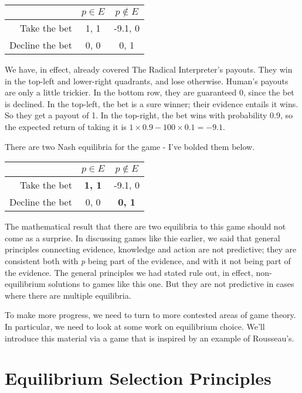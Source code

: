 \begin{center}
\begin{tabular}{r | c c}
& $p \in E$ & $p \notin E$ \\ \hline
Take the bet & 1, 1 & -9.1, 0 \\
Decline the bet & 0, 0 & 0, 1
\end{tabular}
\end{center}


We have, in effect, already covered The Radical Interpreter's payouts. They win in the top-left and lower-right quadrants, and lose otherwise. Human's payouts are only a little trickier. In the bottom row, they are guaranteed 0, since the bet is declined. In the top-left, the bet is a sure winner; their evidence entails it wins. So they get a payout of 1. In the top-right, the bet wins with probability 0.9, so the expected return of taking it is $1 \times 0.9 - 100 \times 0.1 = -9.1$.

There are two Nash equilibria for the game - I've bolded them below.


\begin{center}
\begin{tabular}{r | c c}
& $p \in E$ & $p \notin E$ \\ \hline
Take the bet & \textbf{1, 1} & -9.1, 0 \\
Decline the bet & 0, 0 & \textbf{0, 1}
\end{tabular}
\end{center}


The mathematical result that there are two equilibria to this game should not come as a surprise. In discussing games like thie earlier, we said that general principles connecting evidence, knowledge and action are not predictive; they are consistent both with \emph{p} being part of the evidence, and with it not being part of the evidence. The general principles we had stated rule out, in effect, non-equilibrium solutions to games like this one. But they are not predictive in cases where there are multiple equilibria. 

To make more progress, we need to turn to more contested areas of game theory. In particular, we need to look at some work on equilibrium choice. We'll introduce this material via a game that is inspired by an example of Rousseau's.

\section{Equilibrium Selection Principles}
\label{equilibriumselectionprinciples}

